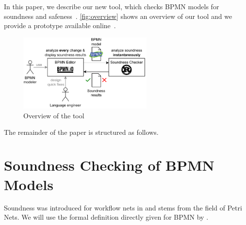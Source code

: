 \documentclass[runningheads]{llncs}
\begin{document}
\cite{fahlandAnalysisDemandInstantaneous2011}


In this paper, we describe our new tool, which checks BPMN models for soundness and safeness~\cite{corradiniClassificationBPMNCollaborations2018}.
\autoref{fig:overview} shows an overview of our tool and we provide a prototype available online~\cite{noauthorgivenBPM2024Artifacts2024}.

\begin{figure}[ht]
	\centering
	\includegraphics[width=0.6\textwidth]{images/overview}
	\caption{Overview of the tool}
	\label{fig:overview}
\end{figure}


The remainder of the paper is structured as follows.

\section{Soundness Checking of BPMN Models} \label{sec:soundness}

Soundness was introduced for workflow nets in \cite{vanderaalstApplicationPetriNets1998} and stems from the field of Petri Nets.
We will use the formal definition directly given for BPMN by \cite{corradiniClassificationBPMNCollaborations2018}.
\end{document}

